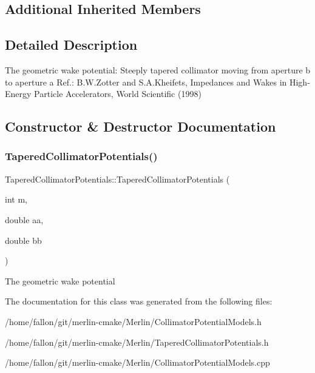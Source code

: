 \subsection*{Additional Inherited Members}


\subsection{Detailed Description}
The geometric wake potential\+: Steeply tapered collimator moving from aperture b to aperture a Ref.\+: B.\+W.\+Zotter and S.\+A.\+Kheifets, Impedances and Wakes in High-\/\+Energy Particle Accelerators, World Scientific (1998) 

\subsection{Constructor \& Destructor Documentation}
\mbox{\label{classTaperedCollimatorPotentials_a93bceeb8d67c5d1c20067dc372fb6098}} 
\subsubsection{\texorpdfstring{Tapered\+Collimator\+Potentials()}{TaperedCollimatorPotentials()}}
{\footnotesize\ttfamily Tapered\+Collimator\+Potentials\+::\+Tapered\+Collimator\+Potentials (\begin{DoxyParamCaption}\item[{int}]{m,  }\item[{double}]{aa,  }\item[{double}]{bb }\end{DoxyParamCaption})}

The geometric wake potential 

The documentation for this class was generated from the following files\+:\begin{DoxyCompactItemize}
\item 
/home/fallon/git/merlin-\/cmake/\+Merlin/Collimator\+Potential\+Models.\+h\item 
/home/fallon/git/merlin-\/cmake/\+Merlin/Tapered\+Collimator\+Potentials.\+h\item 
/home/fallon/git/merlin-\/cmake/\+Merlin/Collimator\+Potential\+Models.\+cpp\end{DoxyCompactItemize}
